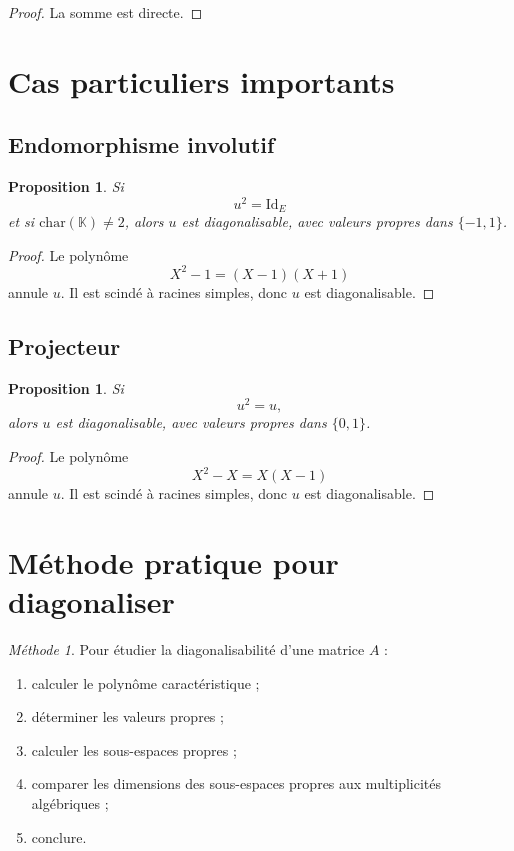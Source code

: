 \documentclass[11pt,a4paper]{article}
\newtheorem{proposition}[definition]{Proposition}
\theoremstyle{remark}
\newtheorem*{methode}{Méthode}
\newcommand{\K}{\mathbb{K}}
\newcommand{\id}{\mathrm{Id}}
\begin{document}
\begin{proof}
La somme est directe.
\end{proof}

\section{Cas particuliers importants}

\subsection{Endomorphisme involutif}

\begin{proposition}
Si
\[
u^2=\id_E
\]
et si \(\mathrm{char}(\K)\neq 2\), alors \(u\) est diagonalisable, avec valeurs propres dans \(\{-1,1\}\).
\end{proposition}

\begin{proof}
Le polynôme
\[
X^2-1=(X-1)(X+1)
\]
annule \(u\). Il est scindé à racines simples, donc \(u\) est diagonalisable.
\end{proof}

\subsection{Projecteur}

\begin{proposition}
Si
\[
u^2=u,
\]
alors \(u\) est diagonalisable, avec valeurs propres dans \(\{0,1\}\).
\end{proposition}

\begin{proof}
Le polynôme
\[
X^2-X=X(X-1)
\]
annule \(u\). Il est scindé à racines simples, donc \(u\) est diagonalisable.
\end{proof}

\section{Méthode pratique pour diagonaliser}

\begin{methode}
Pour étudier la diagonalisabilité d’une matrice \(A\) :
\begin{enumerate}
    \item calculer le polynôme caractéristique ;
    \item déterminer les valeurs propres ;
    \item calculer les sous-espaces propres ;
    \item comparer les dimensions des sous-espaces propres aux multiplicités algébriques ;
    \item conclure.
\end{enumerate}
\end{methode}
\end{document}

